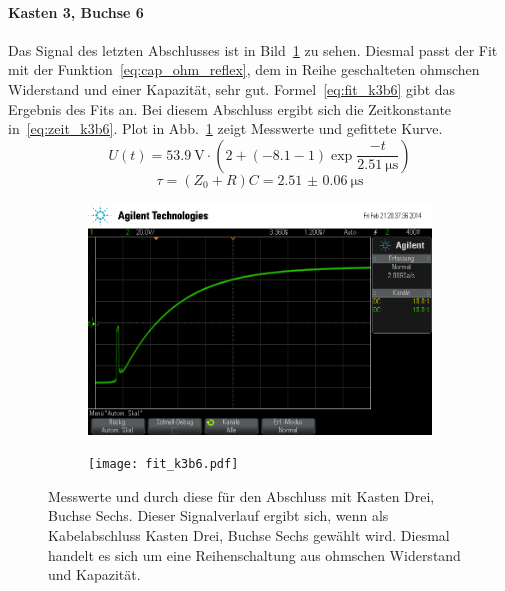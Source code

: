 \paragraph{Kasten 3, Buchse 6}
Das Signal des letzten Abschlusses ist in Bild~\ref{fig:k3b6} zu sehen.
Diesmal passt der Fit mit der Funktion~\eqref{eq:cap_ohm_reflex}, dem in
Reihe geschalteten ohmschen Widerstand und einer Kapazität, sehr gut.
Formel~\eqref{eq:fit_k3b6} gibt das Ergebnis des Fits an.  Bei diesem
Abschluss ergibt sich die Zeitkonstante in~\eqref{eq:zeit_k3b6}.  Plot
in Abb.~\ref{fig:k3b6} zeigt Messwerte und gefittete Kurve.
%
\begin{equation}
  U(t) = \SI{53.9}{\volt}\cdot\left(2 + 
    \left(-8.1 - 1\right)\exp{\frac{-t}{\SI{2.51}{\micro\second}}}\right)
  \label{eq:fit_k3b6}
\end{equation}
%
\begin{equation}
  \tau = (Z_0 + R)C = \SI{2.51(6)}{\micro\second}
  \label{eq:zeit_k3b6}
\end{equation}
%
\begin{figure}[]
  \centering

  \begin{subfigure}{0.45\textwidth}
    \includegraphics[width=\textwidth]{k3b6.png}
  \end{subfigure}
  \quad
  \begin{subfigure}{0.45\textwidth}
    \texttt{[image: fit\_k3b6.pdf]}
  \end{subfigure}

  \caption{Messwerte und durch diese für den Abschluss mit Kasten Drei,
    Buchse Sechs.  Dieser Signalverlauf ergibt sich, wenn als
    Kabelabschluss Kasten Drei, Buchse Sechs gewählt wird. Diesmal
    handelt es sich um eine Reihenschaltung aus ohmschen Widerstand und
    Kapazität.}
  \label{fig:k3b6}
\end{figure}
